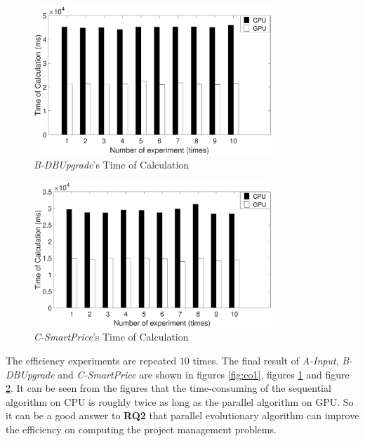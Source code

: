 \begin{figure}[!htb]
  \centering
  \includegraphics[width=0.8\textwidth]{figures/fig_co2.eps}
  \caption{\emph{B-DBUpgrade}'s Time of Calculation}
  \label{fig:co2}
\end{figure}

\begin{figure}[!htb]
  \centering
  \includegraphics[width=0.8\textwidth]{figures/fig_co3.eps}
  \caption{\emph{C-SmartPrice}'s Time of Calculation}
  \label{fig:co3}
\end{figure}

The efficiency experiments are repeated $10$ times.  The final result of
\emph{A-Input}, \emph{B-DBUpgrade} and \emph{C-SmartPrice} are shown in figures
\ref{fig:co1}, figures \ref{fig:co2} and figure \ref{fig:co3}. It can be seen
from the figures that the time-consuming of the sequential algorithm on CPU is
roughly twice as long as the parallel algorithm on GPU. So it can be a good
answer to \textbf{RQ2} that parallel evolutionary algorithm can improve the
efficiency on computing the project management problems.

